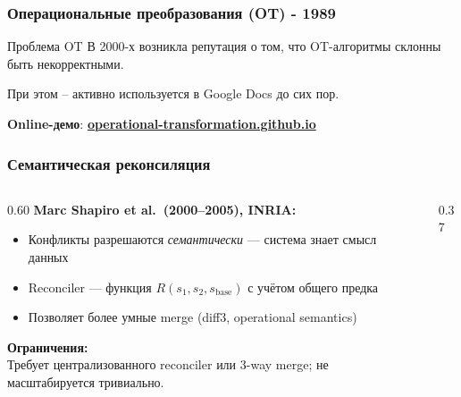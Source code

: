 \documentclass{beamer}
\begin{document}
\begin{frame}
\frametitle{Операциональные преобразования (OT) - 1989}

\vspace{0.3em}
\begin{alertblock}{Проблема OT}
В 2000-х возникла репутация о том, что OT-алгоритмы склонны быть некорректными.

При этом – активно используется в Google Docs до сих пор.
\end{alertblock}

\textbf{Online-демо}: {\bfseries \href{https://operational-transformation.github.io/}{operational-transformation.github.io}}

\end{frame}

\begin{frame}
\frametitle{Семантическая реконсиляция}

\begin{columns}
\begin{column}{0.60\textwidth}
\textbf{Marc Shapiro et al.\ (2000–2005), INRIA:}
\begin{itemize}
  \item Конфликты разрешаются \emph{семантически} — система знает смысл данных
  \item Reconciler — функция $R(s_1, s_2, s_\text{base})$ с учётом общего предка
  \item Позволяет более умные merge (diff3, operational semantics)
\end{itemize}

\bigskip
\textbf{Ограничения:}\\
Требует централизованного reconciler или 3-way merge; не масштабируется тривиально.
\end{column}
\begin{column}{0.37\textwidth}
\end{column}
\end{columns}

\end{frame}
\end{document}
